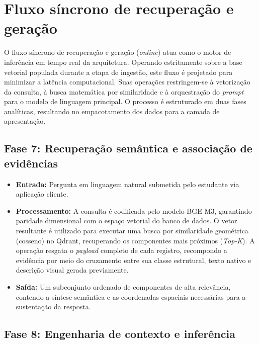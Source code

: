 \section{Fluxo síncrono de recuperação e geração}
\label{sec:fluxo_sincrono_recuperacao_geracao}

O fluxo síncrono de recuperação e geração (\textit{online}) atua como o motor de inferência em tempo real da arquitetura. Operando estritamente sobre a base vetorial populada durante a etapa de ingestão, este fluxo é projetado para minimizar a latência computacional. Suas operações restringem-se à vetorização da consulta, à busca matemática por similaridade e à orquestração do \textit{prompt} para o modelo de linguagem principal. O processo é estruturado em duas fases analíticas, resultando no empacotamento dos dados para a camada de apresentação.

\subsection{Fase 7: Recuperação semântica e associação de evidências}
\label{subsec:fase7_recuperacao_evidencias}

\begin{itemize}
    \item \textbf{Entrada:} Pergunta em linguagem natural submetida pelo estudante via aplicação cliente.
    \item \textbf{Processamento:} A consulta é codificada pelo modelo BGE-M3, garantindo paridade dimensional com o espaço vetorial do banco de dados. O vetor resultante é utilizado para executar uma busca por similaridade geométrica (cosseno) no Qdrant, recuperando os componentes mais próximos (\textit{Top-K}). A operação resgata o \textit{payload} completo de cada registro, recompondo a evidência por meio do cruzamento entre sua classe estrutural, texto nativo e descrição visual gerada previamente.
    \item \textbf{Saída:} Um subconjunto ordenado de componentes de alta relevância, contendo a síntese semântica e as coordenadas espaciais necessárias para a sustentação da resposta.
\end{itemize}

\subsection{Fase 8: Engenharia de contexto e inferência}
\label{subsec:fase8_engenharia_contexto}

